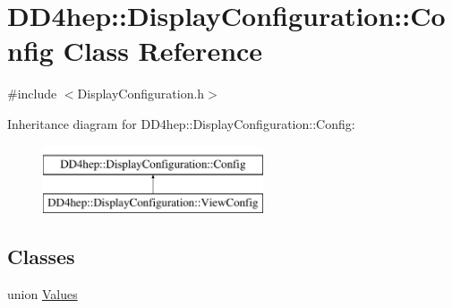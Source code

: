 \hypertarget{class_d_d4hep_1_1_display_configuration_1_1_config}{}\section{D\+D4hep\+:\+:Display\+Configuration\+:\+:Config Class Reference}
\label{class_d_d4hep_1_1_display_configuration_1_1_config}


{\ttfamily \#include $<$Display\+Configuration.\+h$>$}

Inheritance diagram for D\+D4hep\+:\+:Display\+Configuration\+:\+:Config\+:\begin{figure}[H]
\begin{center}
\leavevmode
\includegraphics[height=2.000000cm]{class_d_d4hep_1_1_display_configuration_1_1_config}
\end{center}
\end{figure}
\subsection*{Classes}
\begin{DoxyCompactItemize}
\item 
union \hyperlink{union_d_d4hep_1_1_display_configuration_1_1_config_1_1_values}{Values}
\end{DoxyCompactItemize}
